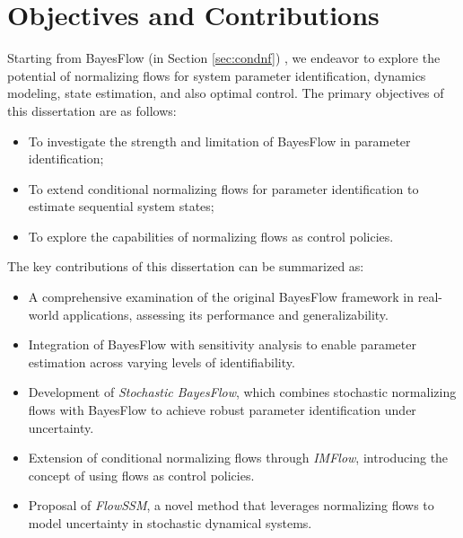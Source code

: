 \section{Objectives and Contributions}
\label{sec:introduction:objectives}
Starting from BayesFlow (in Section \ref{sec:condnf}) \citep{radev2020bayesflow}, we endeavor to explore the potential of normalizing flows for system parameter identification, dynamics modeling, state estimation, and also optimal control. 
The primary objectives of this dissertation are as follows:
\begin{itemize}
    \item To investigate the strength and limitation of BayesFlow in parameter identification;
    \item To extend conditional normalizing flows for parameter identification to estimate sequential system states;
    \item To explore the capabilities of normalizing flows as control policies.
\end{itemize}
The key contributions of this dissertation can be summarized as:
\begin{itemize}
\item A comprehensive examination of the original BayesFlow framework in real-world applications, assessing its performance and generalizability.
\item Integration of BayesFlow with sensitivity analysis to enable parameter estimation across varying levels of identifiability.
\item Development of \textit{Stochastic BayesFlow}, which combines stochastic normalizing flows with BayesFlow to achieve robust parameter identification under uncertainty.
\item Extension of conditional normalizing flows through \textit{IMFlow}, introducing the concept of using flows as control policies.
\item Proposal of \textit{FlowSSM}, a novel method that leverages normalizing flows to model uncertainty in stochastic dynamical systems.
\end{itemize}